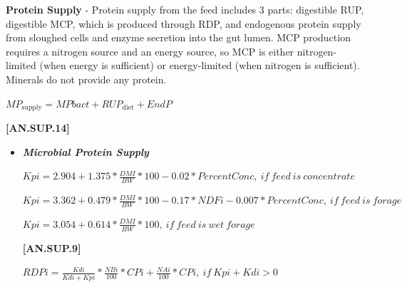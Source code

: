 \begin{refsection}
    \textbf{ Protein Supply} - Protein supply from the feed includes 3 parts: digestible RUP, digestible MCP, which is produced through RDP, and endogenous protein supply from sloughed cells and enzyme secretion into the gut lumen. MCP production requires a nitrogen source and an energy source, so MCP is either nitrogen-limited (when energy is sufficient) or energy-limited (when nitrogen is sufficient). Minerals do not provide any protein.
    \vspace{0.25cm}
    
    \begin{center}
        \(MP_{\text{supply}} = MPbact + RUP_{\text{diet}} + EndP\)
    \end{center}
        \vspace{0.5cm}
    
            {\raggedleft \textbf{[AN.SUP.14]}\par}
            \vspace{0.5cm}
            
    \begin{itemize}
        \item \textbf{\textit{Microbial Protein Supply}} 
    \vspace{0.25cm}

    \begin{center}
        \(Kpi = 2.904 + 1.375 * \frac{DMI}{BW} * 100 - 0.02 * PercentConc,\ if\ feed\ is\ concentrate\)
    \end{center}
        \vspace{0.5cm}
        
    \begin{center}
        \(Kpi = 3.362 + 0.479 * \frac{DMI}{BW} * 100 - 0.17 * NDFi - 0.007 * PercentConc,\ if\ feed\ is\ forage\)
    \end{center}
        \vspace{0.5cm}

    \begin{center}
        \(Kpi =3.054 + 0.614 * \frac{DMI}{BW} * 100,\ if\ feed\ is\ wet\ forage\)
    \end{center}
        \vspace{0.5cm}
    
            {\raggedleft \textbf{[AN.SUP.9]}\par}
            \vspace{0.5cm}

    \begin{center}
        \(RDPi = \frac{Kdi}{Kdi + Kpi} * \frac{NBi}{100} * CPi + \frac{NAi}{100} * CPi,\ if\ Kpi + Kdi > 0 \)
    \end{center}
        \vspace{0.5cm}


\end{itemize}
\end{refsection}
